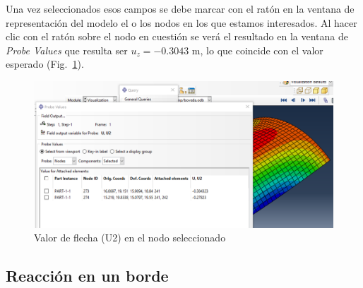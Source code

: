 \documentclass[spanish,a4paper,12pt]{article}
\begin{document}
Una vez seleccionados esos campos se debe marcar con el ratón en la ventana de representación del modelo el o los nodos en los que estamos interesados.
Al hacer clic con el ratón sobre el nodo en cuestión se verá el resultado en la ventana de \emph{Probe Values} que resulta ser $u_{z}=-0.3043$ m, lo que coincide con el valor esperado (Fig.~\ref{fig8}). 
\begin{figure}[h!tp]
\centering
	\includegraphics[scale=0.45]{capturas2019/a_fig34.png}
\caption{Valor de flecha (U2) en el nodo seleccionado}
\label{fig8}
\end{figure}

\clearpage

\subsection{Reacción en un borde}
\end{document}
